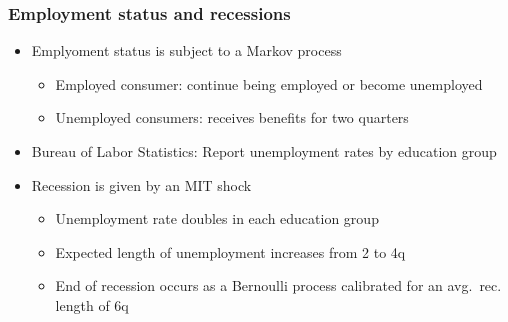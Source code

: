 \documentclass[pdflatex,aspectratio=169]{beamer}
\begin{document}
\begin{frame}
  \frametitle{ Employment status and recessions}
  \begin{itemize}
    \itemsep = \bigskipamount
    \item
          Emplyoment status is subject to a Markov process
          \begin{itemize}
            \itemsep = .5\bigskipamount
            \item
                  Employed consumer: continue being employed or become unemployed
            \item
                  Unemployed consumers: receives benefits for two quarters
          \end{itemize}

    \item
          Bureau of Labor Statistics: Report unemployment rates by education group

    \item
          Recession is given by an MIT shock
          \begin{itemize}
            \itemsep = .5\bigskipamount
            \item
                  Unemployment rate doubles in each education group
            \item
                  Expected length of unemployment increases from 2 to 4q
            \item
                  End of recession occurs as a Bernoulli process calibrated for an avg.\ rec. length of 6q
          \end{itemize}
  \end{itemize}
\end{frame}
\end{document}
